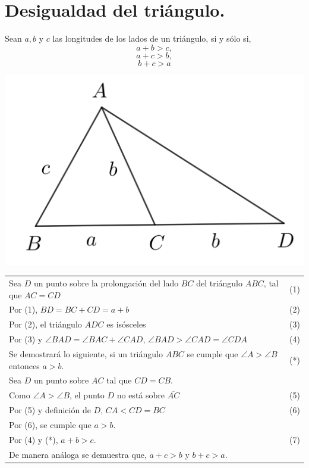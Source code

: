\documentclass[12pt,a4paper,oneside]{book}
\begin{document}
\section{Desigualdad del triángulo.}
Sean $a, b$ y $c$ las longitudes de los lados de un triángulo, si y sólo si, 
$$a+b>c,$$ 
$$a+c>b,$$ 
$$b+c>a$$
\begin{center}
\includegraphics[scale=0.7]{Imagenes/demo2.png} 
\end{center}
\begin{tabular}{p{15.9cm} p{1cm}}\\
Sea $D$ un punto sobre la prolongación del lado $BC$ del triángulo $ABC$, tal que $AC=CD$ & (1)
\\Por (1), $BD=BC+CD=a+b$ & (2)
\\Por (2), el triángulo $ADC$ es isósceles & (3) 
\\Por (3) y $\angle BAD =\angle BAC +\angle CAD$, $\angle BAD > \angle CAD = \angle CDA$ &(4)
\\Se  demostrará lo siguiente, si un triángulo $ABC$ se cumple que $\angle A > \angle B$ entonces $a > b$. &(*)
\\Sea $D$ un punto sobre $AC$ tal que $CD=CB$.
\\Como $\angle A > \angle B$, el punto $D$ no está sobre $\overline{AC}$ & (5)
\\Por (5) y definición de $D$, $CA<CD=BC$ &(6)
\\Por (6), se cumple que $a>b$.
\\Por (4) y (*), $a+b>c$. &
(7)
\\De manera análoga se demuestra que, $a+c>b$ y $b+c>a$.
\end{tabular}
\end{document}
